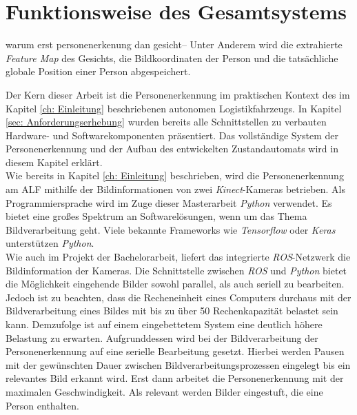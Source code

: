 	
	
	
	 
	
	\section{Funktionsweise des Gesamtsystems}
	\label{sec: Funktionsweise des Gesamtsystems}
	
	warum erst personenerkenung dan gesicht-- Unter Anderem wird die extrahierte \textit{Feature Map} des Gesichts, die Bildkoordinaten der Person und die tatsächliche globale Position einer Person abgespeichert.
	
	Der Kern dieser Arbeit ist die Personenerkennung im praktischen Kontext des im Kapitel \ref{ch: Einleitung} beschriebenen autonomen Logistikfahrzeugs. In Kapitel \ref{sec: Anforderungserhebung} wurden bereits alle Schnittstellen zu verbauten Hardware- und Softwarekomponenten präsentiert. Das vollständige System der Personenerkennung und der Aufbau des entwickelten Zustandautomats wird in diesem Kapitel erklärt.\\
	
	Wie bereits in Kapitel \ref{ch: Einleitung} beschrieben, wird die Personenerkennung am ALF mithilfe der Bildinformationen von zwei \textit{Kinect}-Kameras betrieben. Als Programmiersprache wird im Zuge dieser Masterarbeit \textit{Python} verwendet. Es bietet eine großes Spektrum an Softwarelösungen, wenn um das Thema Bildverarbeitung geht. Viele bekannte Frameworks wie \textit{Tensorflow} oder \textit{Keras} unterstützen \textit{Python}.\\
	
	Wie auch im Projekt der Bachelorarbeit, liefert das integrierte \textit{ROS}-Netzwerk die Bildinformation der Kameras. Die Schnittstelle zwischen \textit{ROS} und \textit{Python} bietet die Möglichkeit eingehende Bilder sowohl parallel, als auch seriell zu bearbeiten. Jedoch ist zu beachten, dass die Recheneinheit eines Computers durchaus mit der Bildverarbeitung eines Bildes mit bis zu über 50 \percent Rechenkapazität belastet sein kann. Demzufolge ist auf einem eingebettetem System eine deutlich höhere Belastung zu erwarten. Aufgrunddessen wird bei der Bildverarbeitung der Personenerkennung auf eine serielle Bearbeitung gesetzt.  Hierbei werden Pausen mit der gewünschten Dauer zwischen Bildverarbeitungsprozessen eingelegt bis ein relevantes Bild erkannt wird. Erst dann arbeitet die Personenerkennung mit der maximalen Geschwindigkeit. Als relevant werden Bilder eingestuft, die eine Person enthalten.\\
	
